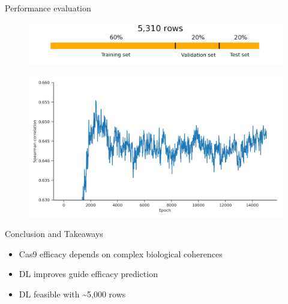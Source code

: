 \documentclass[Nike]{tuberlinbeamer}
\begin{document}
\begin{frame}{Performance evaluation}
  \begin{figure}
    \includegraphics[width=0.60\linewidth]{./datasetpartition.png}
  \end{figure}
  \pause
  \begin{figure}
    \includegraphics[width=0.75\linewidth]{./validation_training_curve.png}
  \end{figure}

\end{frame}


\begin{frame}{Conclusion and Takeaways}
  \begin{itemize}
    \item Cas9 efficacy depends on complex biological coherences %
    \item DL improves guide efficacy prediction %
    \item DL feasible with \textasciitilde5,000 rows
  \end{itemize}

\end{frame}
\end{document}
